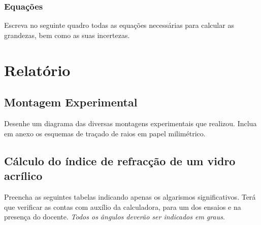 \documentclass[a4paper,12pt]{article}  %
\begin{document}
\noindent\underline{\makebox[\textwidth][r]{~}} \\
\noindent\underline{\makebox[\textwidth][r]{~}} \\
\noindent\underline{\makebox[\textwidth][r]{~}} \\
\noindent\underline{\makebox[\textwidth][r]{~}} \\
\noindent\underline{\makebox[\textwidth][r]{~}} \\
\noindent\underline{\makebox[\textwidth][r]{~}} \\
\noindent\underline{\makebox[\textwidth][r]{~}} \\




\subsubsection{\sf Equações }
Escreva no seguinte quadro todas as equações necessárias para calcular as grandezas, bem como as suas incertezas.
\begin{center}
\framebox[15cm]{\rule{0pt}{8.5cm}}
\end{center}

\newpage
\section{\sf Relatório}
\subsection{\sf Montagem Experimental}
Desenhe um diagrama das diversas montagens experimentais que realizou. Inclua em anexo os esquemas de traçado de raios em papel milimétrico.

\begin{center}
\framebox[18cm]{\rule{0pt}{10cm}}
\end{center}


\subsection{\sf Cálculo do índice de refracção de um vidro acrílico}
Preencha as seguintes tabelas indicando  apenas os algarismos significativos. Terá que verificar as contas com auxílio da calculadora, para um dos ensaios e na presença do docente. \emph{Todos os ângulos deverão ser indicados em graus}. 
\end{document}
